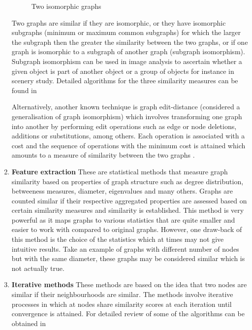 \documentclass[10pt,a4paper]{article}
\begin{document}
\begin{enumerate}
\begin{figure}[H]
\begin{subfigure}[b]{0.35\textwidth}
     			\caption{}
     			\label{isomorphic2}
     		\end{subfigure} 
     		\caption{Two isomorphic graphs} 
     		\label{isomorphism}
     	\end{figure}
     Two graphs are similar if they are isomorphic, or they have isomorphic subgraphs (minimum or maximum common subgraphs) for which the larger the subgraph then the greater the similarity between the two graphs, or if one graph is isomorphic to a subgraph of another graph (subgraph isomorphism). Subgraph isomorphism can be used in image analysis to ascertain whether a given object is part of another object or a group of objects for instance in scenery study. Detailed algorithms for the three similarity measures can be found in \citep{weinberg1966simple,levi1973note,ullmann1976algorithm}
     
     Alternatively, another known technique is graph edit-distance (considered a generalisation of graph isomorphism) which involves transforming one graph into another by performing edit operations such as edge or node deletions, additions or substitutions, among others. Each operation is associated with a cost and the sequence of operations with the minimum cost is attained which amounts to a measure of similarity between the two graphs \citep{gao2010survey}.
     
     \item \textbf{Feature extraction}
     These are statistical methods that measure graph similarity based on properties of graph structure such as degree distribution, betweeness measures, diameter, eigenvalues and many others. Graphs are counted similar if their respective aggregated properties are assessed based on certain similarity measures and similarity is established. This method is very powerful as it maps graphs to various statistics that are quite smaller and easier to work with compared to original graphs. However, one draw-back of this method is the choice of the statistics which at times may not give intuitive results. Take an example of graphs with different number of nodes but with the same diameter, these graphs may be considered similar which is not actually true.
     
     \item \textbf{Iterative methods}
     These methods are based on the idea that two nodes are similar if their neighbourhoods are similar. The methods involve iterative processes in which at nodes share similarity scores at each iteration until convergence is attained. For detailed review of some of the algorithms can be obtained in  \citep{jeh2002simrank,melnik2002similarity,zager2008graph}
     \end{enumerate}
 
\end{document}
